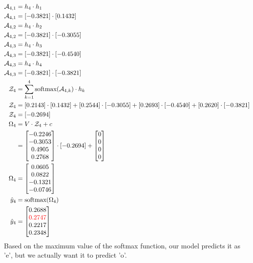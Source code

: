 \documentclass{article}
\begin{document}
\begin{align*}
\mathcal{A}_{4,1} &= h_4 \cdot h_1 \\
\mathcal{A}_{4,1} &= [-0.3821] \cdot [0.1432] \\
\mathcal{A}_{4,2} &= h_4 \cdot h_2 \\
\mathcal{A}_{4,2} &= [-0.3821] \cdot [-0.3055] \\
\mathcal{A}_{4,3} &= h_4 \cdot h_3 \\
\mathcal{A}_{4,3} &= [-0.3821] \cdot [-0.4540] \\
\mathcal{A}_{4,3} &= h_4 \cdot h_4 \\
\mathcal{A}_{4,3} &= [-0.3821] \cdot [-0.3821] \\
\mathcal{Z}_4 &= \sum_{k=1}^4 \text{softmax}(\mathcal{A}_{4,k}) \cdot h_k \\
\mathcal{Z}_4 &= [0.2143] \cdot [0.1432] + [0.2544] \cdot [-0.3055]+ [0.2693] \cdot [-0.4540]+ [0.2620] \cdot [-0.3821]\\
\mathcal{Z}_4 &= [-0.2694] \\
\Omega_4 &= V \cdot \mathcal{Z}_4 + c \\
 &= \begin{bmatrix} -0.2246 \\ -0.3053 \\ 0.4905 \\ 0.2768 \end{bmatrix} \cdot [-0.2694] + \begin{bmatrix} 0 \\ 0 \\ 0 \\ 0\end{bmatrix}\\
\Omega_4 &= \begin{bmatrix} 0.0605 \\ 0.0822 \\ -0.1321 \\ -0.0746 \end{bmatrix} \\
\hat{y}_4 &= \text{softmax}(\Omega_4) \\
\hat{y}_4 &= \begin{bmatrix} 0.2688 \\ \textcolor{red}{0.2747} \\ 0.2217 \\ 0.2348 \end{bmatrix} \\
\end{align*}
Based on the maximum value of the softmax function, our model predicts it as 'e', but we actually want it to predict 'o'.
\end{document}
